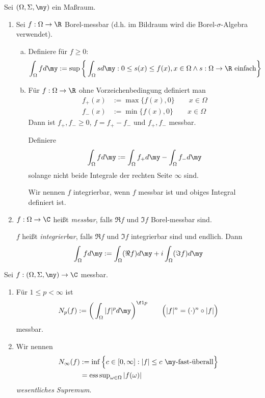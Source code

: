 \documentclass{mycourse}
\newcommand{\esssup}{\operatorname{ess\,sup}}
\begin{document}
\begin{df}
	Sei $(\Omega, \Sigma, \my)$ ein Maßraum.
	
	\begin{enumerate}[1)]
		\item
			Sei $f: \Omega \to \R$ Borel-messbar (d.h. im Bildraum wird die Borel-$\sigma$-Algebra verwendet).

			\begin{enumerate}[a)]
				\item
					Definiere für $f \ge 0$:
					\[
						\int_{\Omega} f d\my 
						:= \sup \bigg\{ \int_{\Omega} s d\my : 0 \le s(x) \le f(x), x \in \Omega \land s : \Omega \to \R \text{ einfach} \bigg\}
					\]
				\item
					Für $f: \Omega \to \R$ ohne Vorzeichenbedingung definiert man
					\begin{align*}
						f_+ (x) &:= \max\{f(x), 0 \} \qquad x \in \Omega \\
						f_- (x) &:= \min\{ f(x), 0 \} \qquad x \in \Omega
					\end{align*}
					Dann ist $f_+, f_- \ge 0$, $f = f_+ - f_-$ und $f_+, f_-$ messbar.
					
					Definiere
					\[
						\int_{\Omega} f d\my := \int_{\Omega} f_+ d\my - \int_{\Omega} f_- d\my
					\]
					solange nicht beide Integrale der rechten Seite $\infty$ sind.

					Wir nennen $f$ integrierbar, wenn $f$ messbar ist und obiges Integral definiert ist.
			\end{enumerate}
		\item
			$f : \Omega \to \C$ heißt \emph{messbar}, falls $\Re f$ und $\Im f$ Borel-messbar sind.

			$f$ heißt \emph{integrierbar}, falls $\Re f$ und $\Im f$ integrierbar sind und endlich. Dann
			\[
				\int_{\Omega} f d\my := \int_{\Omega} (\Re f) d\my + i \int_{\Omega} (\Im f) d\my 
			\]
	\end{enumerate}

\end{df}
	

\begin{df} \label{2.4}
	Sei $f: (\Omega, \Sigma, \my) \to \C$ messbar.
	\begin{enumerate}[1)]
		\item
			Für $1 \le p < \infty$ ist
			\[
				N_p(f) := \bigg( \int_{\Omega} |f|^p d\my \bigg)^{\f 1p}
				\qquad \Big( |f|^n = (\cdot)^n \circ |f| \Big)
			\]
			messbar.
		\item
			Wir nennen
			\begin{align*}
					\displaystyle N_\infty(f) 
					&:= \inf \Big\{ c \in [0,\infty] : |f|\le c \text{ $\my$-fast-überall} \Big\} \\
					&= \esssup_{\omega \in \Omega} |f(\omega)|
			\end{align*}
			\emph{wesentliches Supremum}.
	\end{enumerate}
\end{df}
\end{document}
